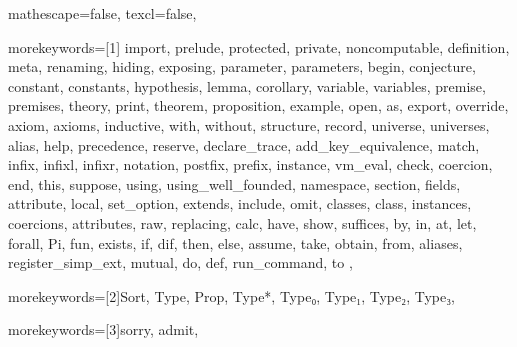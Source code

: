 
 {

mathescape=false,
texcl=false,

morekeywords=[1]{
import, prelude, protected, private, noncomputable, definition, meta, renaming,
hiding, exposing, parameter, parameters, begin, conjecture, constant, constants,
hypothesis, lemma, corollary, variable, variables, premise, premises, theory,
print, theorem, proposition, example,
open, as, export, override, axiom, axioms, inductive, with, without,
structure, record, universe, universes,
alias, help, precedence, reserve, declare_trace, add_key_equivalence,
match, infix, infixl, infixr, notation, postfix, prefix, instance,
vm_eval, check, coercion, end, this, suppose,
using, using_well_founded, namespace, section, fields,
attribute, local, set_option, extends, include, omit, classes, class,
instances, coercions, attributes, raw, replacing,
calc, have, show, suffices, by, in, at, let, forall, Pi, fun,
exists, if, dif, then, else, assume, take, obtain, from, aliases, register_simp_ext,
mutual, do, def, run_command, to
},

morekeywords=[2]{Sort, Type, Prop, Type*, Type₀, Type₁, Type₂, Type₃},

morekeywords=[3]{sorry, admit},


}
